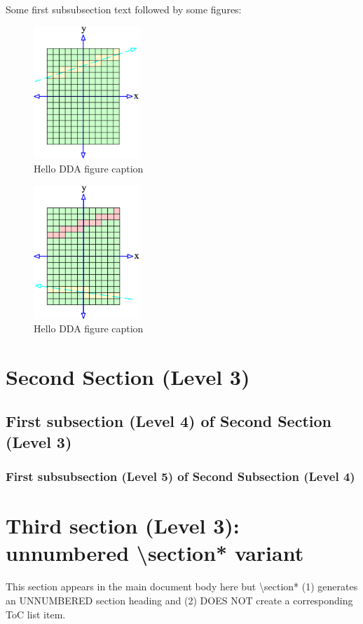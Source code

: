 Some first subsubsection text followed by some figures:
	\begin{figure}
	  \centering
	  \includegraphics[width=4cm]{Space_Carving_1.png}
	  \caption{Hello DDA figure caption }\label{fig:SC-one}
	\end{figure}
	\begin{figure}
	  \centering
	  \includegraphics[width=4cm]{Space_Carving_2.png}
	  \caption{Hello DDA figure caption}\label{fig:SC-two}
	\end{figure}
\section{Second Section (Level 3)}
\subsection{First subsection (Level 4) of Second Section (Level 3)}
\subsubsection{First subsubsection (Level 5) of Second Subsection (Level 4)}
\section*{Third section (Level 3): unnumbered \textbackslash section* variant}
%
This section appears in the main document body here but \textbackslash section* (1) generates an UNNUMBERED section heading
and (2) DOES NOT create a corresponding ToC list item.

